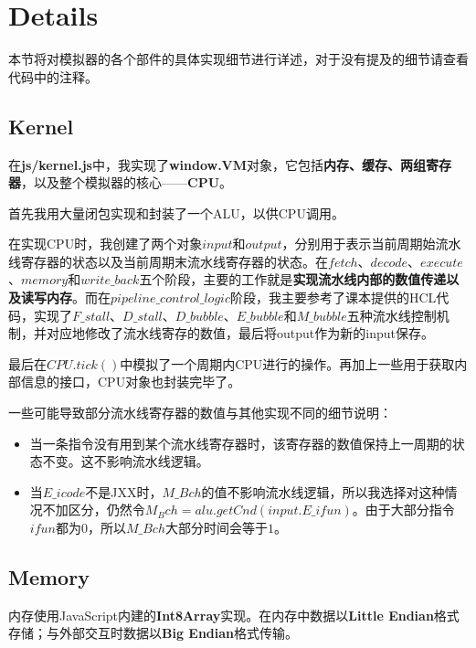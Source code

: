 
\section{Details}

本节将对模拟器的各个部件的具体实现细节进行详述，对于没有提及的细节请查看代码中的注释。

\subsection{Kernel}

在{\bf js/kernel.js}中，我实现了{\bf window.VM}对象，它包括{\bf 内存、缓存、两组寄存器}，以及整个模拟器的核心——{\bf CPU}。

首先我用大量闭包实现和封装了一个ALU，以供CPU调用。

在实现CPU时，我创建了两个对象$input$和$output$，分别用于表示当前周期始流水线寄存器的状态以及当前周期末流水线寄存器的状态。在$fetch$、$decode$、$execute$、$memory$和$write\_back$五个阶段，主要的工作就是{\bf 实现流水线内部的数值传递以及读写内存}。而在$pipeline\_control\_logic$阶段，我主要参考了课本提供的HCL代码，实现了$F\_stall$、$D\_stall$、$D\_bubble$、$E\_bubble$和$M\_bubble$五种流水线控制机制，并对应地修改了流水线寄存的数值，最后将output作为新的input保存。

最后在$CPU.tick()$中模拟了一个周期内CPU进行的操作。再加上一些用于获取内部信息的接口，CPU对象也封装完毕了。

一些可能导致部分流水线寄存器的数值与其他实现不同的细节说明：
\begin{itemize}
\item 当一条指令没有用到某个流水线寄存器时，该寄存器的数值保持上一周期的状态不变。这不影响流水线逻辑。
\item 当$E\_icode$不是JXX时，$M\_Bch$的值不影响流水线逻辑，所以我选择对这种情况不加区分，仍然令$M_Bch = alu.getCnd(input.E\_ifun)$。由于大部分指令$ifun$都为$0$，所以$M\_Bch$大部分时间会等于$1$。
\end{itemize}

\subsection{Memory}

内存使用JavaScript内建的{\bf Int8Array}实现。在内存中数据以{\bf Little Endian}格式存储；与外部交互时数据以{\bf Big Endian}格式传输。

